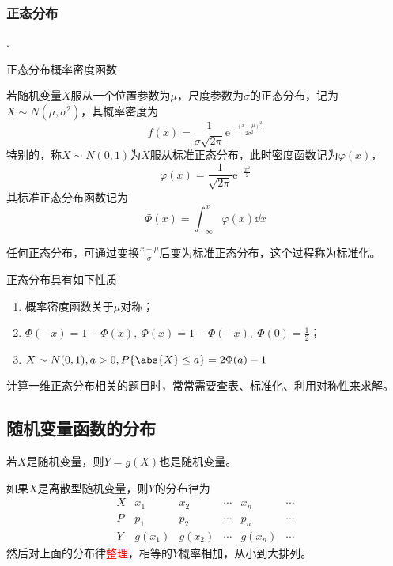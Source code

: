 \subsubsection{正态分布}
.
\begin{marginfigure}
    \centering
    \caption{正态分布概率密度函数}
\end{marginfigure}
\begin{definition}
    若随机变量$X$服从一个位置参数为$\mu$，尺度参数为$\sigma$的正态分布，记为$X\sim N(\mu,\sigma^2)$，其概率密度为
    \[ f(x) = \frac{1}{\sigma\sqrt{2\pi}}\mathrm{e}^{-\frac{(x-\mu)^2}{2\sigma^2}} \]
    特别的，称$X\sim N(0,1)$为$X$服从标准正态分布，此时密度函数记为$\varphi(x)$，
    \[ \varphi(x)=\frac{1}{\sqrt{2\pi}}\mathrm{e}^{-\frac{x^2}{2}} \]
    其标准正态分布函数记为
    \[ \Phi(x) = \int_{-\infty}^x \varphi(x)\dd{x} \]
\end{definition}
任何正态分布，可通过变换$\frac{x-\mu}{\sigma}$后变为标准正态分布，这个过程称为标准化。

正态分布具有如下性质
\begin{enumerate}[(1)]
    \item 概率密度函数关于$\mu$对称；
    \item $\Phi(-x)=1-\Phi(x),\ \Phi(x)=1-\Phi(-x),\ \Phi(0)=\frac{1}{2}$；
    \item $X\sim N(0,1), a>0, P\{\abs{X}\leq a\} = 2\Phi(a)-1$
\end{enumerate}
计算一维正态分布相关的题目时，常常需要查表、标准化、利用对称性来求解。

\subsection{随机变量函数的分布}
若$X$是随机变量，则$Y=g(X)$也是随机变量。

如果$X$是离散型随机变量，则$Y$的分布律为
\[
    \begin{array}{c|ccccc}
        X & x_1    & x_2    & \cdots & x_n    & \cdots \\ \hline
        P & p_1    & p_2    & \cdots & p_n    & \cdots \\ \hline
        Y & g(x_1) & g(x_2) & \cdots & g(x_n) & \cdots
    \end{array}
\]
然后对上面的分布律\textcolor{red}{整理}，相等的$Y$概率相加，从小到大排列。

